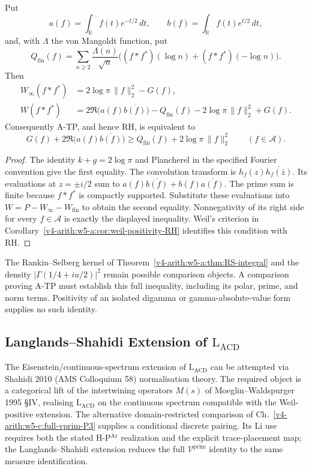 \begin{proposition}
\label{v4-arith:w5-synth:prop:auxiliary-gamma-identity}
Put
\[
 a(f)=\int_{\mathbb R}f(t)e^{-t/2}\,dt,\qquad
 b(f)=\int_{\mathbb R}f(t)e^{t/2}\,dt,
\]
and, with \(\Lambda\) the von Mangoldt function, put
\[
 Q_{\mathrm{fin}}(f)=\sum_{n\ge2}\frac{\Lambda(n)}{\sqrt n}
 \bigl((f*f^*)(\log n)+(f*f^*)(-\log n)\bigr).
\]
Then
\begin{align*}
 W_\infty(f*f^*)&=2\log\pi\,\|f\|_2^2-G(f),\\
 W(f*f^*)&=2\Re\bigl(a(f)\overline{b(f)}\bigr)
   -Q_{\mathrm{fin}}(f)-2\log\pi\,\|f\|_2^2+G(f).
\end{align*}
Consequently A-TP, and hence RH, is equivalent to
\[
 G(f)+2\Re\bigl(a(f)\overline{b(f)}\bigr)
 \ge Q_{\mathrm{fin}}(f)+2\log\pi\,\|f\|_2^2
 \qquad(f\in\mathscr A).
\]
\end{proposition}

\begin{proof}
The identity \(k+g=2\log\pi\) and Plancherel in the specified
Fourier convention give the first equality.
The convolution transform is \(h_f(z)\overline{h_f(\bar z)}\).
Its evaluations at \(z=\pm i/2\) sum to
\(a(f)\overline{b(f)}+b(f)\overline{a(f)}\).
The prime sum is finite because \(f*f^*\) is compactly supported.
Substitute these evaluations into
\(W=P-W_\infty-W_{\mathrm{fin}}\) to obtain the second equality.
Nonnegativity of its right side for every \(f\in\mathscr A\) is
exactly the displayed inequality. Weil's criterion in
Corollary~\ref{v4-arith:w5-a:cor:weil-positivity-RH} identifies this condition
with RH.
\end{proof}

The Rankin--Selberg kernel of Theorem~\ref{v4-arith:w5-a:thm:RS-integral}
and the density \(|\Gamma(1/4+iu/2)|^2\) remain possible comparison
objects. A comparison proving A-TP must establish this full inequality,
including its polar, prime, and norm terms. Positivity of an isolated
digamma or gamma-absolute-value form supplies no such identity.

\subsection{Langlands--Shahidi Extension of \(\mathrm{L}_{\mathrm{ACD}}\)}
\label{v4-arith:w5-synth:LS-extension}

The Eisenstein/continuous-spectrum extension of
\(\mathrm{L}_{\mathrm{ACD}}\) can be attempted via
Shahidi 2010 (AMS Colloquium 58) normalisation theory. The
required object is a categorical lift of the intertwining operators
\(M(s)\) of Moeglin--Waldspurger 1995 \S IV, realising
\(\mathrm{L}_{\mathrm{ACD}}\) on the continuous spectrum compatible
with the Weil-positive extension. The alternative domain-restricted
comparison of Ch.~\ref{v4-arith:w5-c:full-vprim-P3} supplies a
conditional discrete pairing. Its Li use requires both the stated
H-P\(^{\mathrm{Ar}}\) realization and the explicit trace-placement map; the Langlands--Shahidi extension reduces the full
\(\mathcal{V}^{\mathrm{prim}}\) identity to the same measure
identification.

